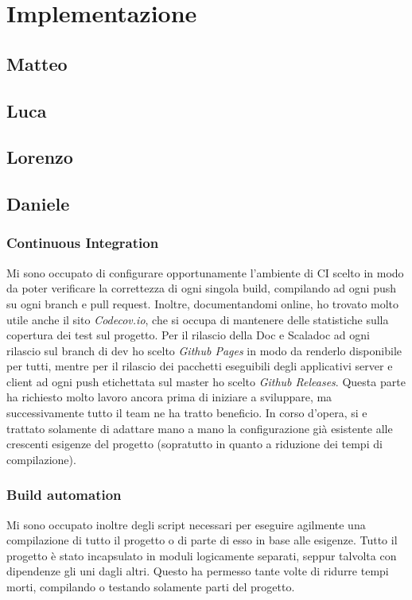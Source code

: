 \documentclass[a4paper,10pt]{article}
\begin{document}
    \section{Implementazione}\label{sec:implementazione}

    \subsection{Matteo}

    \subsection{Luca}

    \subsection{Lorenzo}

    \subsection{Daniele}

    \subsubsection{Continuous Integration}
    Mi sono occupato di configurare opportunamente l'ambiente di CI scelto in modo da poter verificare la correttezza di ogni singola build, compilando ad ogni push su ogni branch e pull request.
    Inoltre, documentandomi online, ho trovato molto utile anche il sito \textit{Codecov.io}, che si occupa di mantenere delle statistiche sulla copertura dei test sul progetto.
    Per il rilascio della Doc e Scaladoc ad ogni rilascio sul branch di dev ho scelto \textit{Github Pages} in modo da renderlo disponibile per tutti, mentre per il rilascio dei pacchetti eseguibili degli applicativi server e client ad ogni push etichettata sul master ho scelto \textit{Github Releases}.
    Questa parte ha richiesto molto lavoro ancora prima di iniziare a sviluppare, ma successivamente tutto il team ne ha tratto beneficio.
    In corso d'opera, si e trattato solamente di adattare mano a mano la configurazione già esistente alle crescenti esigenze del progetto (sopratutto in quanto a riduzione dei tempi di compilazione).

    \subsubsection{Build automation}
    Mi sono occupato inoltre degli script necessari per eseguire agilmente una compilazione di tutto il progetto o di parte di esso in base alle esigenze.
    Tutto il progetto è stato incapsulato in moduli logicamente separati, seppur talvolta con dipendenze gli uni dagli altri.
    Questo ha permesso tante volte di ridurre tempi morti, compilando o testando solamente parti del progetto.
\end{document}
